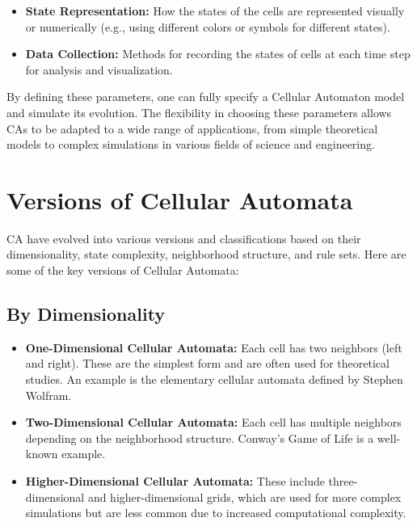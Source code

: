 \documentclass[9pt,a4paper,twoside]{tau-class/tau}
\begin{document}
\begin{itemize}
    \item \textbf{State Representation:} How the states of the cells are represented visually or numerically (e.g., using different colors or symbols for different states).
    \item \textbf{Data Collection:} Methods for recording the states of cells at each time step for analysis and visualization.
\end{itemize}

By defining these parameters, one can fully specify a Cellular Automaton model and simulate its evolution. The flexibility in choosing these parameters allows CAs to be adapted to a wide range of applications, from simple theoretical models to complex simulations in various fields of science and engineering.



\section{Versions of Cellular Automata}
CA have evolved into various versions and classifications based on their dimensionality, state complexity, neighborhood structure, and rule sets. Here are some of the key versions of Cellular Automata:

\subsection{By Dimensionality}

\begin{itemize}
    \item \textbf{One-Dimensional Cellular Automata:} Each cell has two neighbors (left and right). These are the simplest form and are often used for theoretical studies. An example is the elementary cellular automata defined by Stephen Wolfram.
    \item \textbf{Two-Dimensional Cellular Automata:} Each cell has multiple neighbors depending on the neighborhood structure. Conway's Game of Life is a well-known example.
    \item \textbf{Higher-Dimensional Cellular Automata:} These include three-dimensional and higher-dimensional grids, which are used for more complex simulations but are less common due to increased computational complexity.
\end{itemize}
\end{document}
